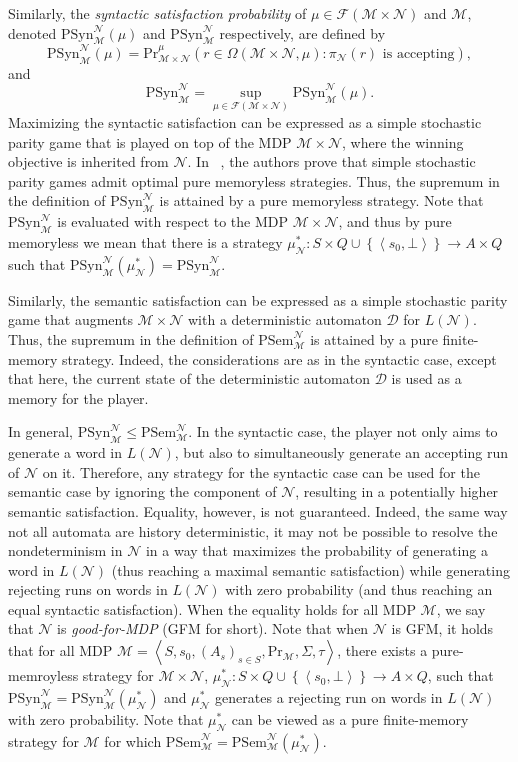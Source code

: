 \documentclass[10pt,a4paper]{amsart}
\theoremstyle{definition}
\numberwithin{equation}{section}
\newcommand{\set}[1]{\{ #1 \}}
\newcommand{\D}{{\mathcal D}}
\newcommand{\M}{{\mathcal M}}
\newcommand{\F}{{\mathcal F}}
\newcommand{\zug}[1]{\left\langle #1 \right\rangle}
\renewcommand{\set}[1]{\left\{ #1 \right\}}
\renewcommand{\Pr}{\mathrm{Pr}}
\newcommand{\N}{{\mathcal N}}
\begin{document}
Similarly, the \emph{syntactic satisfaction probability} of $\mu\in \F(\M\times \N)$ and $\M$, denoted $\mathrm{PSyn}^\N_\M(\mu)$ and $\mathrm{PSyn}^\N_{\M}$ respectively, are defined by
\[
\mathrm{PSyn}^\N_\M(\mu)={\Pr}_{\M\times \N}^\mu(r\in \Omega(\M\times \N,\mu) : \pi_\N(r) \mbox{ is accepting}),
\]
and
\[
\mathrm{PSyn}^\N_{\M}=\sup_{\mu\in \F(\M\times \N)}\mathrm{PSyn}^\N_\M(\mu).
\]
Maximizing the syntactic satisfaction can be expressed as a simple stochastic parity game that is played on top of the MDP $\M\times \N$, where the winning objective is inherited from $\N$. In ~\cite{CH03}, the authors prove that simple stochastic parity games admit optimal pure memoryless strategies. Thus, the supremum in the definition of $\mathrm{PSyn}^\N_{\M}$ is attained by a pure memoryless strategy. Note that $\mathrm{PSyn}^\N_{\M}$ is evaluated with respect to the MDP $\M\times \N$, and thus by pure memoryless we mean that there is a strategy $\mu^*_\N:S\times Q\cup\set{\zug{s_0,\bot}}\rightarrow A\times Q$ such that $\mathrm{PSyn}^\N_{\M}(\mu^*_\N)=\mathrm{PSyn}^\N_{\M}$.

Similarly, the semantic satisfaction can be expressed as a simple stochastic parity game that augments $\M\times\N$ with a deterministic automaton $\D$ for $L(\N)$. Thus, the supremum in the definition of $\mathrm{PSem}^\N_{\M}$ is attained by a pure finite-memory strategy. Indeed, the considerations are as in the syntactic case, except that here, the current state of the deterministic automaton $\D$ is used as a memory for the player.

In general, $\mathrm{PSyn}^\N_\M \leq \mathrm{PSem}^\N_\M$. In the syntactic case, the player not only aims to generate a word in $L(\N)$, but also to simultaneously generate an accepting run of $\N$ on it. Therefore, any strategy for the syntactic case can be used for the semantic case by ignoring the component of $\N$, resulting in a potentially higher semantic satisfaction. Equality, however, is not guaranteed. Indeed, the same way not all automata are history deterministic, it may not be possible to resolve the nondeterminism in $\N$ in a way that maximizes the probability of generating a word in $L(\N)$ (thus reaching a maximal semantic satisfaction) while generating rejecting runs on words in $L(\N)$ with zero probability (and thus reaching an equal syntactic satisfaction). When the equality holds for all MDP $\M$, we say that $\N$ is \emph{good-for-MDP} (GFM for short). Note that when $\N$ is GFM, it holds that for all MDP $\M=\zug{S,s_0,(A_s)_{s\in S},\Pr_{\M},\Sigma,\tau}$, there exists a pure-memroyless strategy for $\M\times \N$, $\mu^*_\N:S\times Q\cup\set{\zug{s_0,\bot}}\rightarrow A\times Q$, such that $\mathrm{PSyn}^\N_{\M}=\mathrm{PSyn}^\N_{\M}(\mu^*_\N)$ and $\mu^*_\N$ generates a rejecting run on words in $L(\N)$ with zero probability. Note that $\mu^*_\N$ can be viewed as a pure finite-memory strategy for $\M$ for which $\mathrm{PSem}^\N_{\M}=\mathrm{PSem}^\N_{\M}(\mu^*_\N)$.
\end{document}
